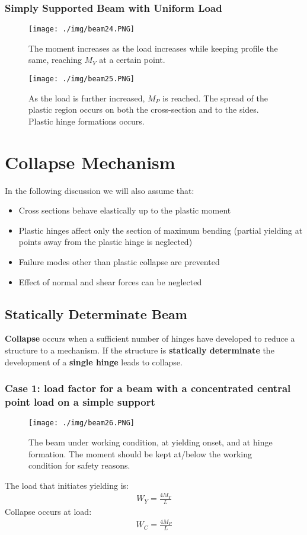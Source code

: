 \subsubsection{\large Simply Supported Beam with Uniform Load}
\begin{figure}[H]
  \centering
  \texttt{[image: ./img/beam24.PNG]}
  \caption{The moment increases as the load increases while keeping profile the same, reaching $M_Y$ at a certain point.}
\end{figure}
\begin{figure}[H]
  \centering
  \texttt{[image: ./img/beam25.PNG]}
  \caption{As the load is further increased, $M_P$ is reached. The spread of the plastic region occurs on both the cross-section and to the sides. Plastic hinge formations occurs.}
\end{figure}
\section{Collapse Mechanism}
In the following discussion we will also assume that:
\begin{itemize}
  \item Cross sections behave elastically up to the plastic moment
  \item Plastic hinges affect only the section of maximum bending (partial yielding at points away from the plastic hinge is neglected)
  \item Failure modes other than plastic collapse are prevented
  \item Effect of normal and shear forces can be neglected
\end{itemize}
\subsection{Statically Determinate Beam}
\textbf{Collapse} occurs when a sufficient number of hinges have developed to reduce a structure to a mechanism. If the structure is \textbf{statically determinate} the development of a \textbf{single hinge} leads to collapse.
\subsubsection{\large Case 1: load factor for a beam with a concentrated central point load on a simple support}
\begin{figure}[H]
  \centering
  \texttt{[image: ./img/beam26.PNG]}
  \caption{The beam under working condition, at yielding onset, and at hinge formation. The moment should be kept at/below the working condition for safety reasons.}
\end{figure}
The load that initiates yielding is:
\begin{gather}
  W_Y = \frac{4M_Y}{L}
\end{gather}
Collapse occurs at load:
\begin{gather}
  W_C = \frac{4M_P}{L}
\end{gather}
